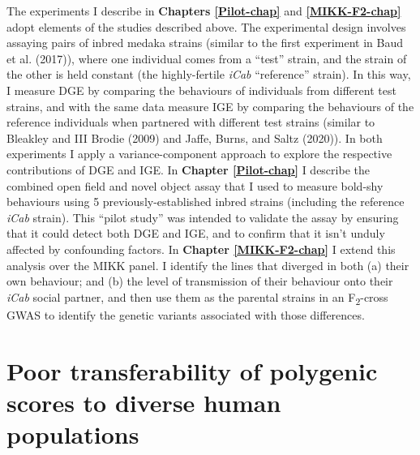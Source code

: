 \documentclass[
]{book}
\begin{document}
The experiments I describe in \textbf{Chapters \ref{Pilot-chap}} and \textbf{\ref{MIKK-F2-chap}} adopt elements of the studies described above. The experimental design involves assaying pairs of inbred medaka strains (similar to the first experiment in Baud et al. (2017)), where one individual comes from a ``test'' strain, and the strain of the other is held constant (the highly-fertile \emph{iCab} ``reference'' strain). In this way, I measure DGE by comparing the behaviours of individuals from different test strains, and with the same data measure IGE by comparing the behaviours of the reference individuals when partnered with different test strains (similar to Bleakley and III Brodie (2009) and Jaffe, Burns, and Saltz (2020)). In both experiments I apply a variance-component approach to explore the respective contributions of DGE and IGE. In \textbf{Chapter \ref{Pilot-chap}} I describe the combined open field and novel object assay that I used to measure bold-shy behaviours using 5 previously-established inbred strains (including the reference \emph{iCab} strain). This ``pilot study'' was intended to validate the assay by ensuring that it could detect both DGE and IGE, and to confirm that it isn't unduly affected by confounding factors. In \textbf{Chapter \ref{MIKK-F2-chap}} I extend this analysis over the MIKK panel. I identify the lines that diverged in both (a) their own behaviour; and (b) the level of transmission of their behaviour onto their \emph{\textcolor{iCab_424B4D}{iCab}} social partner, and then use them as the parental strains in an F\textsubscript{2}-cross GWAS to identify the genetic variants associated with those differences.

\hypertarget{Fst-intro}{%
\section{Poor transferability of polygenic scores to diverse human populations}\label{Fst-intro}}
\end{document}
